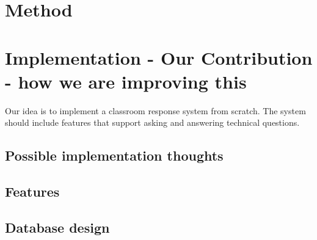 \documentclass{article}
\begin{document}
\section{Method}


\section{Implementation - Our Contribution - how we are improving this}
Our idea is to implement a classroom response system from scratch. The system should include features that support asking and answering technical questions.

\subsection{Possible implementation thoughts}

\subsection{Features} %




\subsection{Database design}










\end{document}
